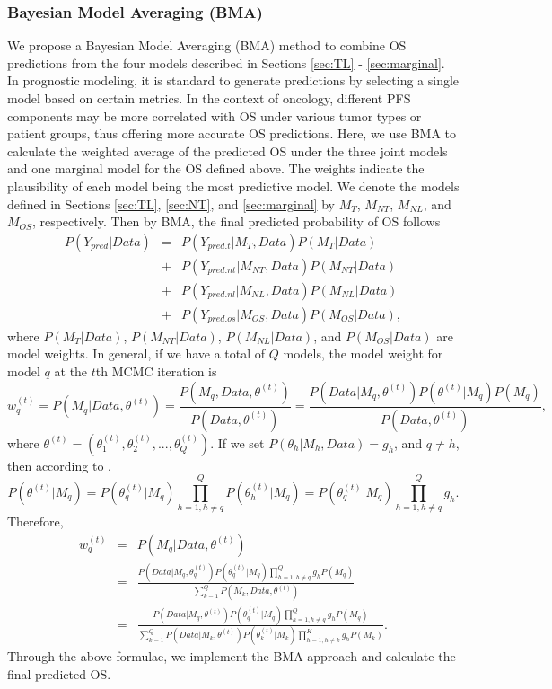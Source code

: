 \documentclass[aoas]{imsart}
\theoremstyle{plain}
\theoremstyle{remark}
\begin{document}
\subsubsection{Bayesian Model Averaging (BMA)}
We propose a Bayesian Model Averaging (BMA) method to combine OS predictions from the four models described in Sections \ref{sec:TL} - \ref{sec:marginal}. In prognostic modeling, it is standard to generate predictions by selecting a single model based on certain metrics. In the context of oncology, different PFS components may be more correlated with OS under various tumor types or patient groups, thus offering more accurate OS predictions. Here, we use BMA to calculate the weighted average of the predicted OS under the three joint models and one marginal model for the OS defined above. The weights indicate the plausibility of each model being the most predictive model. We denote the models defined in Sections \ref{sec:TL}, \ref{sec:NT}, and \ref{sec:marginal} by $M_T$, $M_{NT}$, $M_{NL}$, and $M_{OS}$, respectively. Then by BMA, the final predicted probability of OS follows
\begin{eqnarray*}
P(Y_{pred}|Data)&=&P(Y_{pred.t}|M_T,Data)P(M_T|Data)\\
&+&P(Y_{pred.nt}|M_{NT},Data)P(M_{NT}|Data)\\
&+&P(Y_{pred.nl}|M_{NL},Data)P(M_{NL}|Data)\\
&+&P(Y_{pred.os}|M_{OS},Data)P(M_{OS}|Data),
\end{eqnarray*}
where $P(M_T|Data)$, $P(M_{NT}|Data)$, $P(M_{NL}|Data)$, and $P(M_{OS}|Data)$ are model weights. In general, if we have a total of $Q$ models, the model weight for model $q$ at the $t$th MCMC iteration is  
$$w^{(t)}_q=P(M_q|Data,\theta^{(t)})=\frac{P(M_q,Data,\theta^{(t)})}{P(Data,\theta^{(t)})} =\frac{P(Data|M_q,\theta^{(t)})P(\theta^{(t)}|M_q)P(M_q)}{P(Data,\theta^{(t)})},$$
where $\theta^{(t)} = (\theta_1^{(t)}, \theta_2^{(t)},...,\theta_Q^{(t)})$. If we set $P(\theta_h|M_h, Data)=g_h$, and $q \ne h$, then according to \cite{congdon2007model},
$$P(\theta^{(t)}|M_q)=P(\theta_q^{(t)}|M_q) \prod_{h=1,h\ne q}^Q P(\theta_h^{(t)}|M_q)=P(\theta_q^{(t)}|M_q) \prod_{h=1,h\ne q}^Q g_h.$$
Therefore, 
\begin{eqnarray*}
w^{(t)}_q&=&P(M_q|Data,\theta^{(t)})\\
&=&\frac{P(Data|M_q,\theta^{(t)}_q) P(\theta^{(t)}_q|M_q) \prod_{h=1,h\ne q}^Q g_h P(M_q)}{\sum_{k=1}^Q P(M_k,Data, \theta^{(t)})} \\
&=&\frac{P(Data|M_q,\theta^{(t)}) P(\theta_q^{(t)}|M_q) \prod_{h=1,h\ne q}^Q g_h P(M_q) }{\sum_{k=1}^Q P(Data|M_k,\theta^{(t)}) P(\theta_k^{(t)}|M_k) \prod_{h=1,h\ne k}^K g_h P(M_k)}.    
\end{eqnarray*}
Through the above formulae, we implement the BMA approach and calculate the final predicted OS. 
\end{document}
